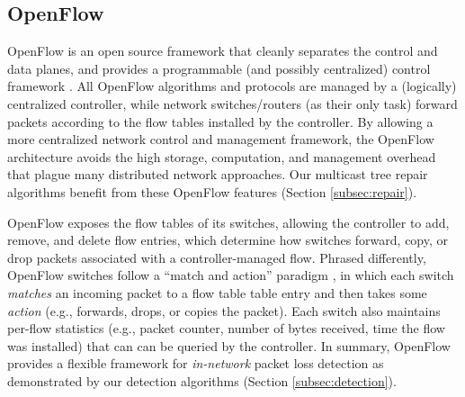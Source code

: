 

\subsection{OpenFlow}
\label{subsec:openflow}

OpenFlow is an open source framework that cleanly separates the control and data planes, and provides a programmable (and possibly centralized) control framework \cite{OpenFlow08}.
All OpenFlow algorithms and protocols are managed by a (logically) centralized controller, 
while network switches/routers (as their only task) forward packets according to the flow tables installed by the controller. 
By allowing a more centralized network control and management framework, the OpenFlow architecture avoids the high storage, computation, and management overhead that plague many distributed network approaches.
Our multicast tree repair algorithms benefit from these OpenFlow features (Section \ref{subsec:repair}).

OpenFlow exposes the flow tables of its switches, allowing the controller to add, remove, and delete flow entries, which determine how switches 
forward, copy, or drop packets associated with a controller-managed flow. 
Phrased differently, OpenFlow switches follow a ``match and action'' paradigm \cite{OpenFlow08}, in which each switch \emph{matches} an incoming packet 
to a flow table table entry and then takes some \emph{action} (e.g., forwards, drops, or copies the packet).
Each switch also maintains per-flow statistics (e.g., packet counter, number of bytes received, time the flow was installed) that can 
can be queried by the controller.  In summary, OpenFlow provides a flexible framework for \emph{in-network} packet loss detection as 
demonstrated by our detection algorithms (Section \ref{subsec:detection}).


